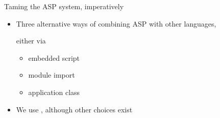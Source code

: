 \begin{frame}{Taming the ASP system, imperatively}
  \bigskip
  \begin{itemize}
  \item Three alternative ways of combining ASP with other languages,

    either via
    \begin{itemize}\normalsize
    \item embedded script
    \item module import
    \item application class
    \end{itemize}
    \bigskip
  \item We use \python, although other choices exist
  \end{itemize}
\end{frame}
